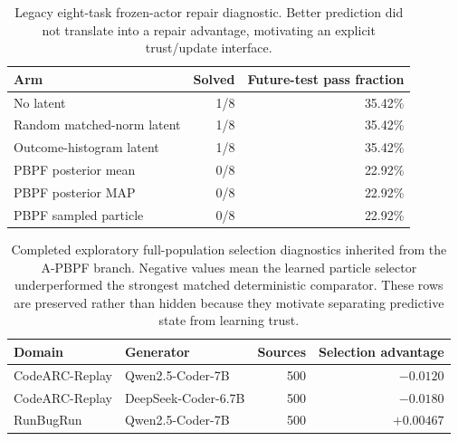 \begin{table}[t]
\centering
\caption{Legacy eight-task frozen-actor repair diagnostic. Better prediction did not
translate into a repair advantage, motivating an explicit trust/update interface.}
\label{tab:legacy-repair}
\small
\begin{tabular}{lrr}
\toprule
Arm & Solved & Future-test pass fraction \\
\midrule
No latent & 1/8 & 35.42\% \\
Random matched-norm latent & 1/8 & 35.42\% \\
Outcome-histogram latent & 1/8 & 35.42\% \\
PBPF posterior mean & 0/8 & 22.92\% \\
PBPF posterior MAP & 0/8 & 22.92\% \\
PBPF sampled particle & 0/8 & 22.92\% \\
\bottomrule
\end{tabular}
\end{table}

\begin{table}[t]
\centering
\caption{Completed exploratory full-population selection diagnostics inherited from
the A-PBPF branch. Negative values mean the learned particle selector underperformed
the strongest matched deterministic comparator. These rows are preserved rather
than hidden because they motivate separating predictive state from learning trust.}
\label{tab:legacy-selection}
\small
\begin{tabular}{llrr}
\toprule
Domain & Generator & Sources & Selection advantage \\
\midrule
CodeARC-Replay & Qwen2.5-Coder-7B & 500 & $-0.0120$ \\
CodeARC-Replay & DeepSeek-Coder-6.7B & 500 & $-0.0180$ \\
RunBugRun & Qwen2.5-Coder-7B & 500 & $+0.00467$ \\
\bottomrule
\end{tabular}
\end{table}


